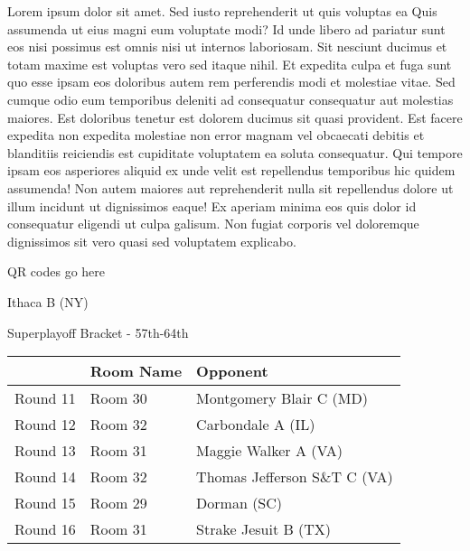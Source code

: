 \documentclass{article}%
\begin{document}
\vspace*{8pt}%
\linebreak%
\newline%
\newline%
    Lorem ipsum dolor sit amet. Sed iusto reprehenderit ut quis voluptas ea Quis assumenda ut eius magni eum voluptate modi? Id unde libero ad pariatur sunt eos nisi possimus est omnis nisi ut internos laboriosam. Sit nesciunt ducimus et totam maxime est voluptas vero sed itaque nihil. Et expedita culpa et fuga sunt quo esse ipsam eos doloribus autem rem perferendis modi et molestiae vitae.\newline%
\newline%
    Sed cumque odio eum temporibus deleniti ad consequatur consequatur aut molestias maiores. Est doloribus tenetur est dolorem ducimus sit quasi provident. Est facere expedita non expedita molestiae non error magnam vel obcaecati debitis et blanditiis reiciendis est cupiditate voluptatem ea soluta consequatur. Qui tempore ipsam eos asperiores aliquid ex unde velit est repellendus temporibus hic quidem assumenda!\newline%
\newline%
    Non autem maiores aut reprehenderit nulla sit repellendus dolore ut illum incidunt ut dignissimos eaque! Ex aperiam minima eos quis dolor id consequatur eligendi ut culpa galisum. Non fugiat corporis vel doloremque dignissimos sit vero quasi sed voluptatem explicabo.\newline%
\newline%
\vspace*{30pt}%
\begin{center}%
\begin{Huge}%
QR codes go here%
\end{Huge}%
\end{center}%
\newpage%
\begin{center}%
\begin{Huge}%
Ithaca B (NY)%
\end{Huge}%
\vspace*{8pt}%
\linebreak%
\begin{Large}%
Superplayoff Bracket {-} 57th{-}64th%
\end{Large}%
\end{center}%
%
\begin{tabularx}{\textwidth}{|c|Y|Y|}%
\hline%
&Room Name&Opponent\\%
\hline%
Round 11&Room 30&Montgomery Blair C (MD)\\%
Round 12&Room 32&Carbondale A (IL)\\%
Round 13&Room 31&Maggie Walker A (VA)\\%
Round 14&Room 32&Thomas Jefferson S\&T C (VA)\\%
Round 15&Room 29&Dorman (SC)\\%
Round 16&Room 31&Strake Jesuit B (TX)\\%
\hline%
\end{tabularx}%
\end{document}
